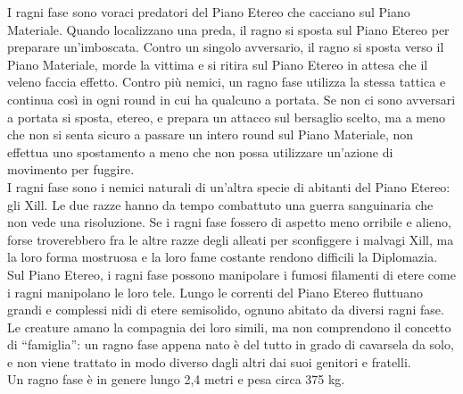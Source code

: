 \begin{multicols}{2}
I ragni fase sono voraci predatori del Piano Etereo che cacciano sul Piano Materiale. Quando localizzano una preda, il ragno si sposta sul Piano Etereo per preparare un'imboscata. Contro un singolo avversario, il ragno si sposta verso il Piano Materiale, morde la vittima e si ritira sul Piano Etereo in attesa che il veleno faccia effetto. Contro più nemici, un ragno fase utilizza la stessa tattica e continua così in ogni round in cui ha qualcuno a portata. Se non ci sono avversari a portata si sposta, etereo, e prepara un attacco sul bersaglio scelto, ma a meno che non si senta sicuro a passare un intero round sul Piano Materiale, non effettua uno spostamento a meno che non possa utilizzare un'azione di movimento per fuggire.\\

I ragni fase sono i nemici naturali di un'altra specie di abitanti del Piano Etereo: gli Xill. Le due razze hanno da tempo combattuto una guerra sanguinaria che non vede una risoluzione. Se i ragni fase fossero di aspetto meno orribile e alieno, forse troverebbero fra le altre razze degli alleati per sconfiggere i malvagi Xill, ma la loro forma mostruosa e la loro fame costante rendono difficili la Diplomazia.\\

Sul Piano Etereo, i ragni fase possono manipolare i fumosi filamenti di etere come i ragni manipolano le loro tele. Lungo le correnti del Piano Etereo fluttuano grandi e complessi nidi di etere semisolido, ognuno abitato da diversi ragni fase. Le creature amano la compagnia dei loro simili, ma non comprendono il concetto di “famiglia”: un ragno fase appena nato è del tutto in grado di cavarsela da solo, e non viene trattato in modo diverso dagli altri dai suoi genitori e fratelli.\\

Un ragno fase è in genere lungo 2,4 metri e pesa circa 375 kg. \\


\end{multicols}
